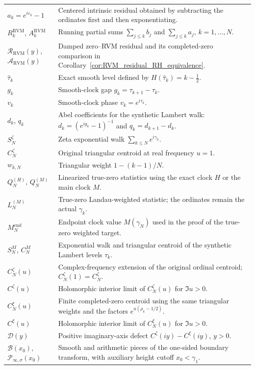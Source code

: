 \documentclass[11pt]{amsart}
\numberwithin{equation}{section}
\theoremstyle{definition}
\theoremstyle{remark}
\newcommand{\cP}{\mathcal P}
\newcommand{\cB}{\mathcal B}
\begin{document}
\begin{longtable}{@{}p{}p{}@{}}
$a_k=e^{i\varepsilon_k}-1$ & Centered intrinsic residual obtained by subtracting the ordinates first and then exponentiating. \\
$R_k^{\mathrm{RVM}}$, $A_k^{\mathrm{RVM}}$ & Running partial sums $\sum_{j\le k}b_j$ and $\sum_{j\le k}a_j$, $k=1,\ldots,N$. \\
$\mathcal R_{\mathrm{RVM}}(y)$, $\mathcal A_{\mathrm{RVM}}(y)$ & Damped zero--RVM residual and its completed-zero comparison in Corollary~\ref{cor:RVM_residual_RH_equivalence}. \\
$\widehat\tau_k$ & Exact smooth level defined by $H(\widehat\tau_k)=k-\tfrac12$. \\
$g_k$ & Smooth-clock gap $g_k=\tau_{k+1}-\tau_k$. \\
$v_k$ & Smooth-clock phase $v_k=e^{i\tau_k}$. \\
$d_k$, $q_k$ & Abel coefficients for the synthetic Lambert walk: $d_k=(e^{ig_k}-1)^{-1}$ and $q_k=d_{k+1}-d_k$. \\
$S_N^{\zeta}$ & Zeta exponential walk $\sum_{k\le N}e^{i\gamma_k}$. \\
$C_N^{\zeta}$ & Original triangular centroid at real frequency $u=1$. \\
$w_{k,N}$ & Triangular weight $1-(k-1)/N$. \\
$Q_N^{(H)}$, $Q_N^{(M)}$ & Linearized true-zero statistics using the exact clock $H$ or the main clock $M$. \\
$L_N^{(M)}$ & True-zero Landau-weighted statistic; the ordinates remain the actual $\gamma_k$. \\
$M_N^{\mathrm{end}}$ & Endpoint clock value $M(\gamma_N)$ used in the proof of the true-zero weighted target. \\
$S_N^M$, $C_N^M$ & Exponential walk and triangular centroid of the synthetic Lambert levels $\tau_k$. \\
$C_N^{\zeta}(u)$ & Complex-frequency extension of the original ordinal centroid; $C_N^{\zeta}(1)=C_N^{\zeta}$. \\
$C^{\zeta}(u)$ & Holomorphic interior limit of $C_N^{\zeta}(u)$ for $\Im u>0$. \\
$C_N^{\xi}(u)$ & Finite completed-zero centroid using the same triangular weights and the factors $e^{u(\rho_k-1/2)}$. \\
$C^{\xi}(u)$ & Holomorphic interior limit of $C_N^{\xi}(u)$ for $\Im u>0$. \\
$\mathcal D(y)$ & Positive imaginary-axis defect $C^{\zeta}(iy)-C^{\xi}(iy)$, $y>0$. \\
$\cB(x_0)$, $\cP_{\infty,\sigma}(x_0)$ & Smooth and arithmetic pieces of the one-sided boundary transform, with auxiliary height cutoff $x_0<\gamma_1$. \\

\end{longtable}
\end{document}
